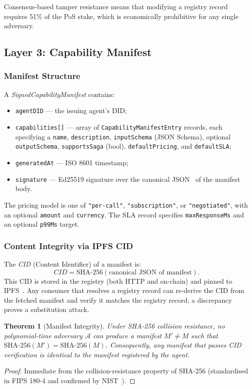 \documentclass[conference]{IEEEtran}
\newtheorem{theorem}{Theorem}
\newcommand{\Adv}{\mathcal{A}}
\begin{document}
Consensus-based tamper resistance means that modifying a
registry record requires 51\% of the PoS stake, which is
economically prohibitive for any single adversary.

\subsection{Layer 3: Capability Manifest}
\label{sec:l3}

\subsubsection{Manifest Structure}

A \textit{SignedCapabilityManifest} contains:
\begin{itemize}
  \item \texttt{agentDID} — the issuing agent's DID;
  \item \texttt{capabilities[]} — array of
    \texttt{CapabilityManifestEntry} records, each specifying a
    \texttt{name}, \texttt{description}, \texttt{inputSchema}
    (JSON Schema), optional \texttt{outputSchema},
    \texttt{supportsSaga} (bool), \texttt{defaultPricing}, and
    \texttt{defaultSLA};
  \item \texttt{generatedAt} — ISO 8601 timestamp;
  \item \texttt{signature} — Ed25519 signature over the
    canonical JSON~\cite{jsoncanon} of the manifest body.
\end{itemize}

The pricing model is one of \texttt{"per-call"},
\texttt{"subscription"}, or \texttt{"negotiated"}, with an
optional \texttt{amount} and \texttt{currency}. The SLA record
specifies \texttt{maxResponseMs} and an optional
\texttt{p99Ms} target.

\subsubsection{Content Integrity via IPFS CID}

The \textit{CID} (Content Identifier) of a manifest is:
\[
  \mathit{CID} = \mathrm{SHA}\text{-}256(\text{canonical JSON of manifest}).
\]
This CID is stored in the registry (both HTTP and on-chain)
and pinned to IPFS~\cite{ipfs2014whitepaper}. Any consumer
that resolves a registry record can re-derive the CID from the
fetched manifest and verify it matches the registry record;
a discrepancy proves a substitution attack.

\begin{theorem}[Manifest Integrity]
\label{thm:manifest}
Under SHA-256 collision resistance, no polynomial-time
adversary $\Adv$ can produce a manifest $M' \neq M$ such that
$\mathrm{SHA}\text{-}256(M') = \mathrm{SHA}\text{-}256(M)$.
Consequently, any manifest that passes CID verification is
identical to the manifest registered by the agent.
\end{theorem}
\begin{proof}
Immediate from the collision-resistance property of SHA-256
(standardised in FIPS 180-4 and confirmed by
NIST~\cite{fips186}).
\end{proof}
\end{document}
